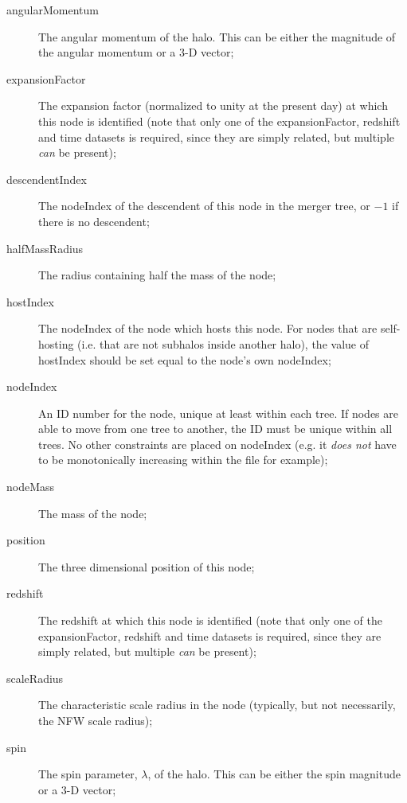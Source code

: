 \begin{description}
 \item [{\normalfont \ttfamily angularMomentum}] The angular momentum of the halo. This can be either the magnitude of the angular momentum or a 3-D vector;
 \item [{\normalfont \ttfamily expansionFactor}] The expansion factor (normalized to unity at the present day) at which this node is identified (note that only one of the {\normalfont \ttfamily expansionFactor}, {\normalfont \ttfamily redshift} and {\normalfont \ttfamily time} datasets is required, since they are simply related, but multiple \emph{can} be present);
 \item [{\normalfont \ttfamily descendentIndex}] The {\normalfont \ttfamily nodeIndex} of the descendent of this node in the merger tree, or $-1$ if there is no descendent;
 \item [{\normalfont \ttfamily halfMassRadius}] The radius containing half the mass of the node;
 \item [{\normalfont \ttfamily hostIndex}] The {\normalfont \ttfamily nodeIndex} of the node which hosts this node. For nodes that are self-hosting (i.e. that are not subhalos inside another halo), the value of {\normalfont \ttfamily hostIndex} should be set equal to the node's own {\normalfont \ttfamily nodeIndex};
 \item [{\normalfont \ttfamily nodeIndex}] An ID number for the node, unique at least within each tree. If nodes are able to move from one tree to another, the ID must be unique within all trees. No other constraints are placed on {\normalfont \ttfamily nodeIndex} (e.g. it \emph{does not} have to be monotonically increasing within the file for example);
 \item [{\normalfont \ttfamily nodeMass}] The mass of the node;
 \item [{\normalfont \ttfamily position}] The three dimensional position of this node;
 \item [{\normalfont \ttfamily redshift}] The redshift at which this node is identified (note that only one of the {\normalfont \ttfamily expansionFactor}, {\normalfont \ttfamily redshift} and {\normalfont \ttfamily time} datasets is required, since they are simply related, but multiple \emph{can} be present);
 \item [{\normalfont \ttfamily scaleRadius}] The characteristic scale radius in the node (typically, but not necessarily, the NFW scale radius);
 \item [{\normalfont \ttfamily spin}] The spin parameter, $\lambda$, of the halo. This can be either the spin magnitude or a 3-D vector;

\end{description}
